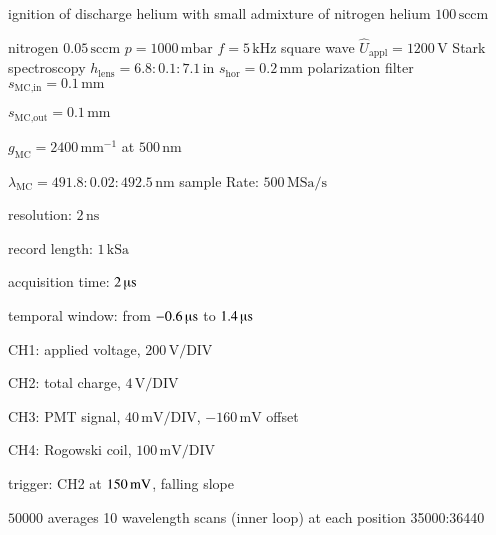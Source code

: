 \begin{Liste}
	\itemwas ignition of discharge
	 helium with small admixture of nitrogen
	 helium $100\,\text{sccm}$
	\item nitrogen $0.05\,\text{sccm}$
	 $p=1000\,\text{mbar}$
	 $f=5\,\text{kHz}$
	 square wave
	 $\hat U_\text{appl}=1200\,\text{V}$
	\leer
	\itemwas Stark spectroscopy
	 $h_\text{lens}=6.8:0.1:7.1\,\text{in}$
	 $s_\text{hor}=0.2\,\text{mm}$
	 polarization filter
 	 $s_\text{MC,in}=0.1\,\text{mm}$
	\item $s_\text{MC,out}=0.1\,\text{mm}$
	\item $g_\text{MC}=2400\,\text{mm}^{-1}$ at $500\,\text{nm}$
	\item $\lambda_\text{MC}=491.8:0.02:492.5\,\text{nm}$
	\leer
	 sample Rate: $500\,\text{MSa}/\text{s}$
	\item resolution: $2\,\text{ns}$
	\item record length: $1\,\text{kSa}$
	\item acquisition time: $2\,\text{\textmu s}$
	\item temporal window: from $-0.6\,\text{\textmu s}$ to $1.4\,\text{\textmu s}$
	\item CH1: applied voltage, $200\,\text{V}/\text{DIV}$
	\item CH2: total charge, $4\,\text{V}/\text{DIV}$
	\item CH3: PMT signal, $40\,\text{mV}/\text{DIV}$, $-160\,\text{mV}$ offset
	\item CH4: Rogowski coil, $100\,\text{mV}/\text{DIV}$
	\item trigger: CH2 at $\-150\,\text{mV}$, falling slope
	\item $50000$ averages
	 10 wavelength scans (inner loop) at each position
	\leer
	 35000:36440
\end{Liste}

